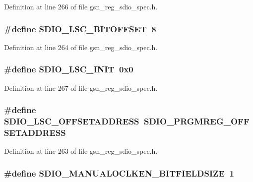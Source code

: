 Definition at line 266 of file gsn\_\-reg\_\-sdio\_\-spec.h.

\hypertarget{a00571_a98034b9d44e6847c1c6863558884a9e5}{
\subsubsection[{SDIO\_\-LSC\_\-BITOFFSET}]{\setlength{\rightskip}{0pt plus 5cm}\#define SDIO\_\-LSC\_\-BITOFFSET~8}}
\label{a00571_a98034b9d44e6847c1c6863558884a9e5}


Definition at line 264 of file gsn\_\-reg\_\-sdio\_\-spec.h.

\hypertarget{a00571_aa337c67176b8b54e70dfa94680a852fe}{
\subsubsection[{SDIO\_\-LSC\_\-INIT}]{\setlength{\rightskip}{0pt plus 5cm}\#define SDIO\_\-LSC\_\-INIT~0x0}}
\label{a00571_aa337c67176b8b54e70dfa94680a852fe}


Definition at line 267 of file gsn\_\-reg\_\-sdio\_\-spec.h.

\hypertarget{a00571_a87eddab043aad5647654d88a7fb1849e}{
\subsubsection[{SDIO\_\-LSC\_\-OFFSETADDRESS}]{\setlength{\rightskip}{0pt plus 5cm}\#define SDIO\_\-LSC\_\-OFFSETADDRESS~SDIO\_\-PRGMREG\_\-OFFSETADDRESS}}
\label{a00571_a87eddab043aad5647654d88a7fb1849e}


Definition at line 263 of file gsn\_\-reg\_\-sdio\_\-spec.h.

\hypertarget{a00571_ad27e0ac58fd45037c3c7eda9ff8c92ef}{
\subsubsection[{SDIO\_\-MANUALOCLKEN\_\-BITFIELDSIZE}]{\setlength{\rightskip}{0pt plus 5cm}\#define SDIO\_\-MANUALOCLKEN\_\-BITFIELDSIZE~1}}
\label{a00571_ad27e0ac58fd45037c3c7eda9ff8c92ef}


